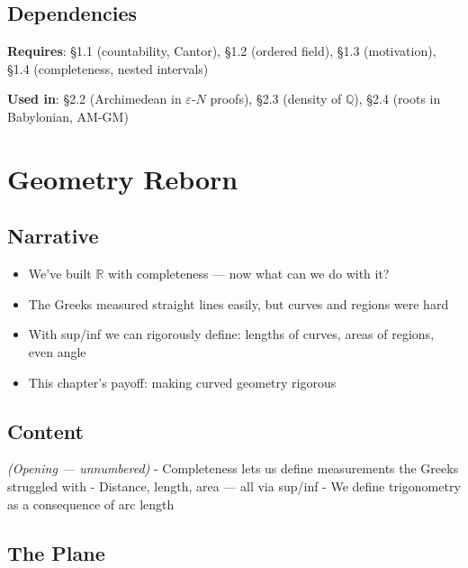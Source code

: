 \documentclass[
  10pt,
  letterpaper,
]{scrbook}
\providecommand{\tightlist}{%
  \setlength{\itemsep}{0pt}\setlength{\parskip}{0pt}}
\newcommand{\QQ}{\mathbb{Q}}
\begin{document}
\subsection{Dependencies}\label{dependencies-3}

\textbf{Requires}: §1.1 (countability, Cantor), §1.2 (ordered field),
§1.3 (motivation), §1.4 (completeness, nested intervals)

\textbf{Used in}: §2.2 (Archimedean in \(\varepsilon\)-\(N\) proofs),
§2.3 (density of \(\QQ\)), §2.4 (roots in Babylonian, AM-GM)

\section{Geometry Reborn}\label{geometry-reborn}

\subsection{Narrative}\label{narrative-4}

\begin{itemize}
\tightlist
\item
  We've built \(\mathbb{R}\) with completeness --- now what can we do
  with it?
\item
  The Greeks measured straight lines easily, but curves and regions were
  hard
\item
  With sup/inf we can rigorously define: lengths of curves, areas of
  regions, even angle
\item
  This chapter's payoff: making curved geometry rigorous
\end{itemize}

\subsection{Content}\label{content-4}

\emph{(Opening --- unnumbered)} - Completeness lets us define
measurements the Greeks struggled with - Distance, length, area --- all
via sup/inf - We define trigonometry as a consequence of arc length

\subsection{The Plane}\label{the-plane}
\end{document}
